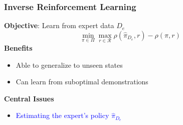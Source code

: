 \documentclass{beamer}
\begin{document}
\begin{frame}
	\frametitle{Inverse Reinforcement Learning}
	\textbf{Objective}: Learn from expert data $D_e$
	\[ 
		\min_{\pi \in \Pi} \max_{r \in \mathcal{R}} \rho(\hat{\pi}_{D_e}, r) - \rho(\pi, r)
	\]
	\vfill
	\textbf{Benefits}
	\begin{itemize}
		\item Able to generalize to unseen states
		\item Can learn from suboptimal demonstrations
	\end{itemize}
	\vfill
	\textbf{Central Issues}
	\begin{itemize}
		\item \textcolor{blue}{Estimating the expert's policy $\hat{\pi}_{D_e}$}
	\end{itemize}
\end{frame}
\end{document}
